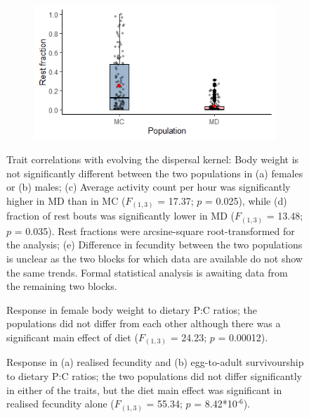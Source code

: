 \documentclass[12pt,onecolumn,twoside]{article}
\begin{document}
\begin{figure}
\begin{subfigure}{0.49\textwidth}
			\subcaption{\label{fig2c}\empty}
		\end{subfigure}
		\begin{subfigure}{0.49\textwidth}
			\includegraphics[width=\textwidth, keepaspectratio]{fig1f.png}
			\subcaption{\label{fig2d}\empty}
		\end{subfigure}
		\begin{subfigure}{0.49\textwidth}
			\centering
			\scalebox{0.6}{}
			\subcaption{\label{fig2e}\empty}
		\end{subfigure}
		\caption{\label{fig2} Trait correlations with evolving the dispersal kernel: Body weight is not significantly different between the two populations in (a) females or (b) males; (c) Average activity count per hour was significantly higher in MD than in MC ($F_{(1, 3)}$ = 17.37; $p$ = 0.025), while (d) fraction of rest bouts was significantly lower in MD ($F_{(1, 3)}$ = 13.48; $p$ = 0.035). Rest fractions were arcsine-square root-transformed for the analysis; (e) Difference in fecundity between the two populations is unclear as the two blocks for which data are available do not show the same trends. Formal statistical analysis is awaiting data from the remaining two blocks.}
	\end{figure}
	\begin{figure}
		\centering
		\scalebox{0.7}{}
		\caption{\label{fig3} Response in female body weight to dietary P:C ratios; the populations did not differ from each other although there was a significant main effect of diet ($F_{(1, 3)}$ = 24.23; $p$ = 0.00012).}
	\end{figure}
	\begin{figure}
		\centering
		\begin{subfigure}{\textwidth}
			\scalebox{0.35}{}
			\subcaption{\empty}
		\end{subfigure}
		\begin{subfigure}{\textwidth}
			\scalebox{0.35}{}
			\subcaption{\empty}
		\end{subfigure}
		\caption{\label{fig4} Response in (a) realised fecundity and (b) egg-to-adult survivourship to dietary P:C ratios; the two populations did not differ significantly in either of the traits, but the diet main effect was significant in realised fecundity alone ($F_{(1, 3)}$ = 55.34; $p$ = 8.42*10$^{\text{-6}}$).}
	\end{figure}
\end{document}
